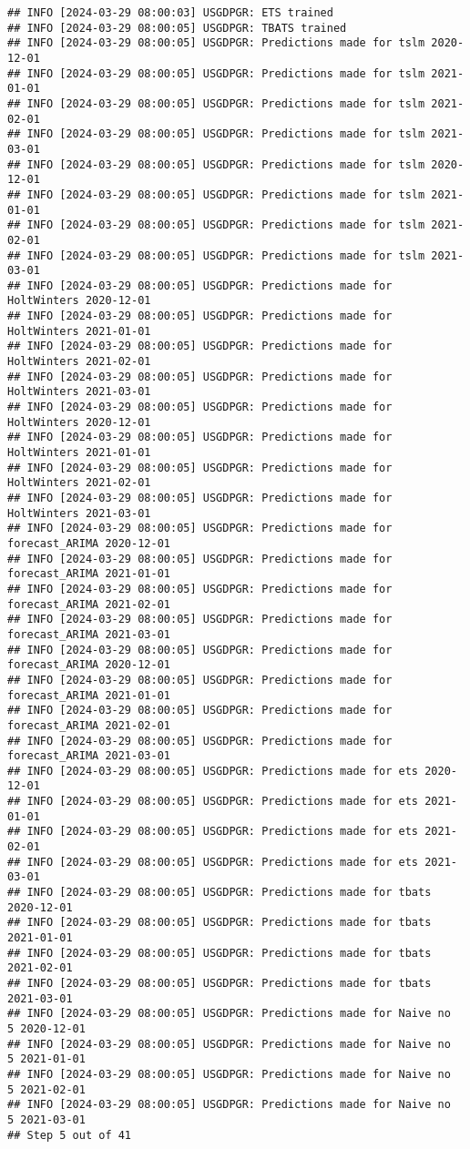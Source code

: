 \documentclass[
]{article}
\begin{document}
\begin{verbatim}
## INFO [2024-03-29 08:00:03] USGDPGR: ETS trained
## INFO [2024-03-29 08:00:05] USGDPGR: TBATS trained
## INFO [2024-03-29 08:00:05] USGDPGR: Predictions made for tslm 2020-12-01
## INFO [2024-03-29 08:00:05] USGDPGR: Predictions made for tslm 2021-01-01
## INFO [2024-03-29 08:00:05] USGDPGR: Predictions made for tslm 2021-02-01
## INFO [2024-03-29 08:00:05] USGDPGR: Predictions made for tslm 2021-03-01
## INFO [2024-03-29 08:00:05] USGDPGR: Predictions made for tslm 2020-12-01
## INFO [2024-03-29 08:00:05] USGDPGR: Predictions made for tslm 2021-01-01
## INFO [2024-03-29 08:00:05] USGDPGR: Predictions made for tslm 2021-02-01
## INFO [2024-03-29 08:00:05] USGDPGR: Predictions made for tslm 2021-03-01
## INFO [2024-03-29 08:00:05] USGDPGR: Predictions made for HoltWinters 2020-12-01
## INFO [2024-03-29 08:00:05] USGDPGR: Predictions made for HoltWinters 2021-01-01
## INFO [2024-03-29 08:00:05] USGDPGR: Predictions made for HoltWinters 2021-02-01
## INFO [2024-03-29 08:00:05] USGDPGR: Predictions made for HoltWinters 2021-03-01
## INFO [2024-03-29 08:00:05] USGDPGR: Predictions made for HoltWinters 2020-12-01
## INFO [2024-03-29 08:00:05] USGDPGR: Predictions made for HoltWinters 2021-01-01
## INFO [2024-03-29 08:00:05] USGDPGR: Predictions made for HoltWinters 2021-02-01
## INFO [2024-03-29 08:00:05] USGDPGR: Predictions made for HoltWinters 2021-03-01
## INFO [2024-03-29 08:00:05] USGDPGR: Predictions made for forecast_ARIMA 2020-12-01
## INFO [2024-03-29 08:00:05] USGDPGR: Predictions made for forecast_ARIMA 2021-01-01
## INFO [2024-03-29 08:00:05] USGDPGR: Predictions made for forecast_ARIMA 2021-02-01
## INFO [2024-03-29 08:00:05] USGDPGR: Predictions made for forecast_ARIMA 2021-03-01
## INFO [2024-03-29 08:00:05] USGDPGR: Predictions made for forecast_ARIMA 2020-12-01
## INFO [2024-03-29 08:00:05] USGDPGR: Predictions made for forecast_ARIMA 2021-01-01
## INFO [2024-03-29 08:00:05] USGDPGR: Predictions made for forecast_ARIMA 2021-02-01
## INFO [2024-03-29 08:00:05] USGDPGR: Predictions made for forecast_ARIMA 2021-03-01
## INFO [2024-03-29 08:00:05] USGDPGR: Predictions made for ets 2020-12-01
## INFO [2024-03-29 08:00:05] USGDPGR: Predictions made for ets 2021-01-01
## INFO [2024-03-29 08:00:05] USGDPGR: Predictions made for ets 2021-02-01
## INFO [2024-03-29 08:00:05] USGDPGR: Predictions made for ets 2021-03-01
## INFO [2024-03-29 08:00:05] USGDPGR: Predictions made for tbats 2020-12-01
## INFO [2024-03-29 08:00:05] USGDPGR: Predictions made for tbats 2021-01-01
## INFO [2024-03-29 08:00:05] USGDPGR: Predictions made for tbats 2021-02-01
## INFO [2024-03-29 08:00:05] USGDPGR: Predictions made for tbats 2021-03-01
## INFO [2024-03-29 08:00:05] USGDPGR: Predictions made for Naive no  5 2020-12-01
## INFO [2024-03-29 08:00:05] USGDPGR: Predictions made for Naive no  5 2021-01-01
## INFO [2024-03-29 08:00:05] USGDPGR: Predictions made for Naive no  5 2021-02-01
## INFO [2024-03-29 08:00:05] USGDPGR: Predictions made for Naive no  5 2021-03-01
## Step 5 out of 41
\end{verbatim}
\end{document}
